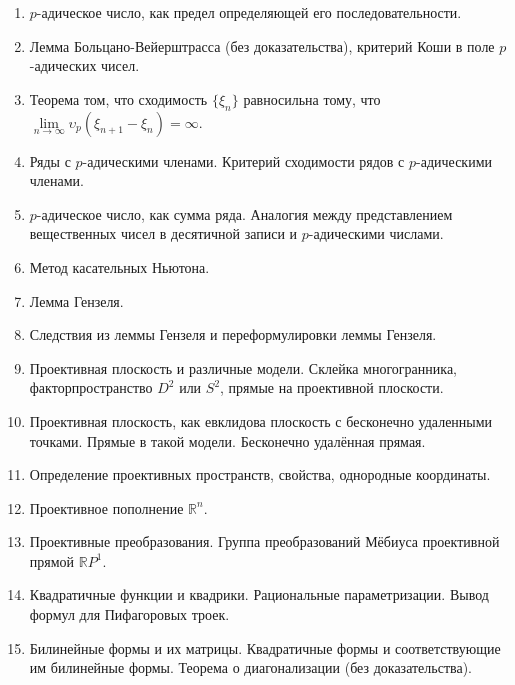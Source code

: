 \documentclass[12pt]{article}
\begin{document}
\begin{enumerate}
    \item $p$-адическое число, как предел определяющей его последовательности.

    \item Лемма Больцано-Вейерштрасса (без доказательства), критерий Коши в поле $p$-адических чисел.

    \item Теорема том, что сходимость $\{ \xi_n \}$ равносильна тому, что $\lim\limits_{n \to \infty} \upsilon_p{(\xi_{n + 1} - \xi_n)} = \infty$.

    \item Ряды с $p$-адическими членами. Критерий сходимости рядов с $p$-адическими членами.

    \item $p$-адическое число, как сумма ряда. Аналогия между представлением вещественных чисел в десятичной записи и $p$-адическими числами.

    \item Метод касательных Ньютона.

    \item Лемма Гензеля.

    \item  Следствия из леммы Гензеля и переформулировки леммы Гензеля.

    \item Проективная плоскость и различные модели. Склейка многогранника, факторпространство $D^2$ или $S^2$, прямые на проективной плоскости.

    \item Проективная плоскость, как евклидова плоскость с бесконечно удаленными точками. Прямые в такой модели. Бесконечно удалённая прямая.

    \item Определение проективных пространств, свойства, однородные координаты.

    \item Проективное пополнение $\mathbb{R}^n$.

    \item Проективные преобразования. Группа преобразований Мёбиуса проективной прямой $\mathbb{R}P^1$.

    \item Квадратичные функции и квадрики. Рациональные параметризации. Вывод формул для Пифагоровых троек.

    \item Билинейные формы и их матрицы. Квадратичные формы и соответствующие им  билинейные формы. Теорема о диагонализации (без доказательства).


\end{enumerate}
\end{document}
